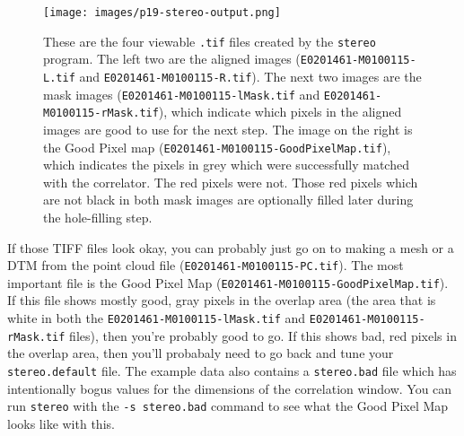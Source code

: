 \begin{figure}
\begin{center}
\texttt{[image: images/p19-stereo-output.png]}
\caption[P19 stereo output images]{
    \label{p19-stereo-output}
	These are the four viewable \texttt{.tif} files created by
	the \texttt{stereo} program.  The left two are the aligned
	images (\texttt{E0201461-M0100115-L.tif} and
	\texttt{E0201461-M0100115-R.tif}).  The next two images are
	the mask images (\texttt{E0201461-M0100115-lMask.tif} and
	\texttt{E0201461-M0100115-rMask.tif}), which indicate which
	pixels in the aligned images are good to use for the next
	step.  The image on the right is the Good Pixel map
	(\texttt{E0201461-M0100115-GoodPixelMap.tif}), which indicates
	the pixels in grey which were successfully matched with the
	correlator.  The red pixels were not.  Those red pixels which
	are not black in both mask images are optionally filled later
	during the hole-filling step.
    }
\end{center}
\end{figure}

%

If those TIFF files look okay, you can probably just go on to making
a mesh or a DTM from the point cloud file
(\texttt{E0201461-M0100115-PC.tif}).  The most important file is
the Good Pixel Map (\texttt{E0201461-M0100115-GoodPixelMap.tif}).
If this file shows mostly good, gray pixels in the overlap area
(the area that is white in both the \texttt{E0201461-M0100115-lMask.tif}
and \texttt{E0201461-M0100115-rMask.tif} files), then you're probably
good to go.  If this shows bad, red pixels in the overlap area,
then you'll probabaly need to go back and tune your \texttt{stereo.default}
file.  The example data also contains a \texttt{stereo.bad} file
which has intentionally bogus values for the dimensions of the
correlation window.  You can run \texttt{stereo} with the \texttt{-s
stereo.bad} command to see what the Good Pixel Map looks like with
this.

